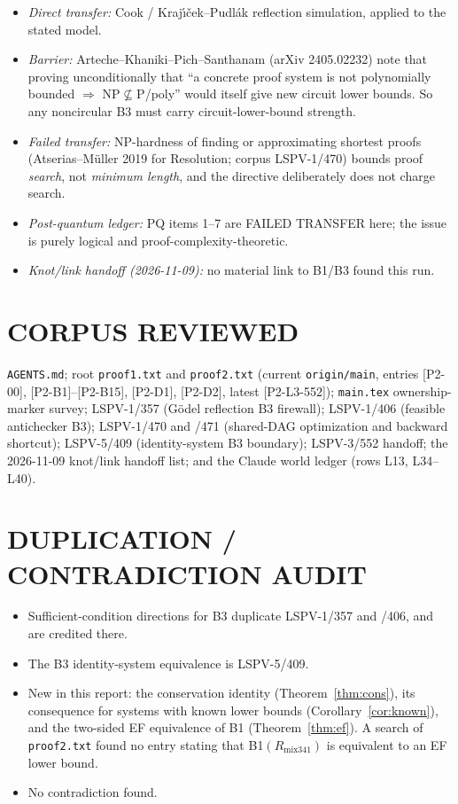 \documentclass[11pt]{article}
\theoremstyle{remark}
\begin{document}
\begin{itemize}
\item \emph{Direct transfer:} Cook / Kraj\'\i\v{c}ek--Pudl\'ak reflection simulation, applied to the stated model.
\item \emph{Barrier:} Arteche--Khaniki--Pich--Santhanam (arXiv 2405.02232) note that proving unconditionally that ``a concrete proof system is not polynomially bounded $\Rightarrow$ NP$\not\subseteq$P/poly'' would itself give new circuit lower bounds. So any noncircular B3 must carry circuit-lower-bound strength.
\item \emph{Failed transfer:} NP-hardness of finding or approximating shortest proofs (Atserias--M\"uller 2019 for Resolution; corpus LSPV-1/470) bounds proof \emph{search}, not \emph{minimum length}, and the directive deliberately does not charge search.
\item \emph{Post-quantum ledger:} PQ items 1--7 are FAILED TRANSFER here; the issue is purely logical and proof-complexity-theoretic.
\item \emph{Knot/link handoff (2026-11-09):} no material link to B1/B3 found this run.
\end{itemize}

\section*{CORPUS REVIEWED}
\texttt{AGENTS.md}; root \texttt{proof1.txt} and \texttt{proof2.txt} (current \texttt{origin/main}, entries [P2-00], [P2-B1]--[P2-B15], [P2-D1], [P2-D2], latest [P2-L3-552]); \texttt{main.tex} ownership-marker survey; LSPV-1/357 (G\"odel reflection B3 firewall); LSPV-1/406 (feasible antichecker B3); LSPV-1/470 and /471 (shared-DAG optimization and backward shortcut); LSPV-5/409 (identity-system B3 boundary); LSPV-3/552 handoff; the 2026-11-09 knot/link handoff list; and the Claude world ledger (rows L13, L34--L40).

\section*{DUPLICATION / CONTRADICTION AUDIT}
\begin{itemize}
\item Sufficient-condition directions for B3 duplicate LSPV-1/357 and /406, and are credited there.
\item The B3 identity-system equivalence is LSPV-5/409.
\item New in this report: the conservation identity (Theorem~\ref{thm:cons}), its consequence for systems with known lower bounds (Corollary~\ref{cor:known}), and the two-sided EF equivalence of B1 (Theorem~\ref{thm:ef}). A search of \texttt{proof2.txt} found no entry stating that B1$(R_{\mathrm{mix341}})$ is equivalent to an EF lower bound.
\item No contradiction found.
\end{itemize}
\end{document}
